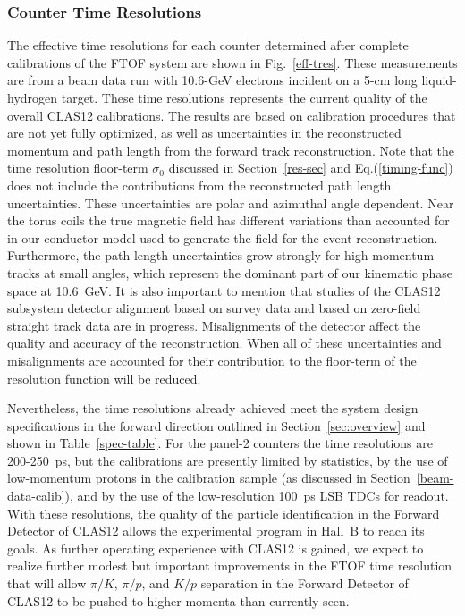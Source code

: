 \documentclass[final,3p,twocolumn]{elsarticle}
\begin{document}
\subsubsection{Counter Time Resolutions}
\label{tres-beam}

The effective time resolutions for each counter determined after complete calibrations of the FTOF
system are shown in Fig.~\ref{eff-tres}. These measurements are from a beam data run with 10.6-GeV
electrons incident on a 5-cm long liquid-hydrogen target. These time resolutions represents the current
quality of the overall CLAS12 calibrations. The results are based on calibration procedures that are not
yet fully optimized, as well as uncertainties in the reconstructed momentum and path length from the
forward track reconstruction. Note that the time resolution floor-term $\sigma_0$ discussed in
Section~\ref{res-sec} and Eq.(\ref{timing-func}) does not include the contributions from the
reconstructed path length uncertainties. These uncertainties are polar and azimuthal angle dependent.
Near the torus coils the true magnetic field has different variations than accounted for in our conductor
model used to generate the field for the event reconstruction. Furthermore, the path length uncertainties
grow strongly for high momentum tracks at small angles, which represent the dominant part of our kinematic
phase space at 10.6~GeV. It is also important to mention that studies of the CLAS12 subsystem detector
alignment based on survey data and based on zero-field straight track data are in progress. Misalignments
of the detector affect the quality and accuracy of the reconstruction. When all of these uncertainties and
misalignments are accounted for their contribution to the floor-term of the resolution function will be
reduced.

Nevertheless, the time resolutions already achieved meet the system design specifications in the forward
direction outlined in Section~\ref{sec:overview} and shown in Table~\ref{spec-table}. For the panel-2
counters the time resolutions are 200-250~ps, but the calibrations are presently limited by statistics, by
the use of low-momentum protons in the calibration sample (as discussed in Section~\ref{beam-data-calib}),
and by the use of the low-resolution 100~ps LSB TDCs for readout. With these resolutions, the quality of the
particle identification in the Forward Detector of CLAS12 allows the experimental program in Hall~B to reach
its goals. As further operating experience with CLAS12 is gained, we expect to realize further modest but
important improvements in the FTOF time resolution that will allow $\pi/K$, $\pi/p$, and $K/p$ separation
in the Forward Detector of CLAS12 to be pushed to higher momenta than currently seen.
\end{document}
